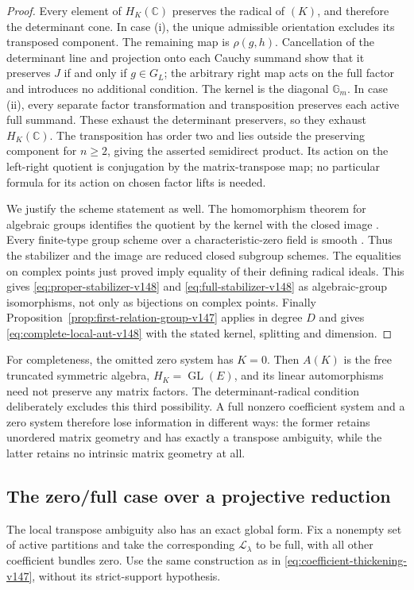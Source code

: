 \documentclass[11pt,reqno]{amsart}
\numberwithin{equation}{section}
\theoremstyle{definition}\newtheorem{definition}[theorem]{Definition}
\theoremstyle{remark}\newtheorem{remark}[theorem]{Remark}
\newcommand{\C}{\mathbb C}\newcommand{\Q}{\mathbb Q}
\begin{document}
\begin{proof}
Every element of \(H_K(\C)\) preserves the radical of \((K)\),
and therefore the determinant cone.  In case (i), the unique
admissible orientation excludes its transposed component.  The
remaining map is \(\rho(g,h)\).  Cancellation of the determinant
line and projection onto each Cauchy summand show that it preserves
\(J\) if and only if \(g\in G_L\); the arbitrary right map
acts on the full factor and introduces no additional condition.
The kernel is the diagonal \(\mathbb G_m\).  In case (ii),
every separate factor transformation and transposition preserves
each active full summand.  These exhaust the determinant preservers,
so they exhaust \(H_K(\C)\).  The transposition has order two
and lies outside the preserving component for \(n\ge2\), giving
the asserted semidirect product.  Its action on the left-right
quotient is conjugation by the matrix-transpose map; no particular
formula for its action on chosen factor lifts is needed.

We justify the scheme statement as well.  The homomorphism theorem
for algebraic groups identifies the quotient by the kernel with
the closed image \cite[Theorem~5.39 and Remark~5.42]{Milne2017}.
Every finite-type group scheme over a characteristic-zero field is
smooth \cite[Lemma~39.8.2]{StacksGroups}.  Thus the stabilizer and
the image are reduced closed subgroup schemes.  The equalities on
complex points just proved imply equality of their defining radical
ideals.  This gives \eqref{eq:proper-stabilizer-v148} and
\eqref{eq:full-stabilizer-v148} as algebraic-group isomorphisms,
not only as bijections on complex points.  Finally
Proposition~\ref{prop:first-relation-group-v147} applies in degree
\(D\) and gives \eqref{eq:complete-local-aut-v148} with the
stated kernel, splitting and dimension.
\end{proof}

For completeness, the omitted zero system has \(K=0\).
Then \(A(K)\) is the free truncated symmetric algebra,
\(H_K=\operatorname{GL}(E)\), and its linear automorphisms
need not preserve any matrix factors.  The determinant-radical
condition deliberately excludes this third possibility.  A full
nonzero coefficient system and a zero system therefore lose
information in different ways: the former retains unordered
matrix geometry and has exactly a transpose ambiguity, while the
latter retains no intrinsic matrix geometry at all.

\subsection{The zero/full case over a projective reduction}
The local transpose ambiguity also has an exact global form.  Fix
a nonempty set of active partitions and take the corresponding
\(\mathcal L_\lambda\) to be full, with all other coefficient
bundles zero.  Use the same construction as in
\eqref{eq:coefficient-thickening-v147}, without its strict-support
hypothesis.
\end{document}

